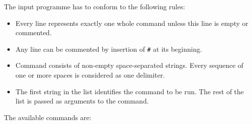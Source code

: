 
The input programme has to conform to the following rules:

\begin{itemize}
  \item Every line represents exactly one whole command unless this line is empty or commented.
  \item Any line can be commented by insertion of \texttt{\#} at its beginning.
  \item Command consists of non-empty space-separated strings. Every sequence of one or more spaces is considered as one delimiter.
  \item The first string in the list identifies the command to be run. The rest of the list is passed as arguments to the command.
\end{itemize}

The available commands are:

